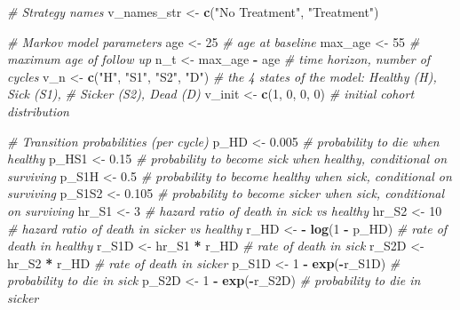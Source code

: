 \documentclass[
]{article}
\newenvironment{Shaded}{\begin{snugshade}}{\end{snugshade}}
\newcommand{\CommentTok}[1]{\textcolor[rgb]{0.56,0.35,0.01}{\textit{#1}}}
\newcommand{\DecValTok}[1]{\textcolor[rgb]{0.00,0.00,0.81}{#1}}
\newcommand{\FloatTok}[1]{\textcolor[rgb]{0.00,0.00,0.81}{#1}}
\newcommand{\KeywordTok}[1]{\textcolor[rgb]{0.13,0.29,0.53}{\textbf{#1}}}
\newcommand{\NormalTok}[1]{#1}
\newcommand{\OperatorTok}[1]{\textcolor[rgb]{0.81,0.36,0.00}{\textbf{#1}}}
\newcommand{\StringTok}[1]{\textcolor[rgb]{0.31,0.60,0.02}{#1}}
\begin{document}
\begin{Shaded}
\begin{Highlighting}[]
\CommentTok{# Strategy names}
\NormalTok{v_names_str <-}\StringTok{ }\KeywordTok{c}\NormalTok{(}\StringTok{"No Treatment"}\NormalTok{, }\StringTok{"Treatment"}\NormalTok{) }

\CommentTok{# Markov model parameters}
\NormalTok{age      <-}\StringTok{ }\DecValTok{25}                       \CommentTok{# age at baseline}
\NormalTok{max_age  <-}\StringTok{ }\DecValTok{55}                       \CommentTok{# maximum age of follow up}
\NormalTok{n_t      <-}\StringTok{ }\NormalTok{max_age }\OperatorTok{-}\StringTok{ }\NormalTok{age            }\CommentTok{# time horizon, number of cycles}
\NormalTok{v_n      <-}\StringTok{ }\KeywordTok{c}\NormalTok{(}\StringTok{"H"}\NormalTok{, }\StringTok{"S1"}\NormalTok{, }\StringTok{"S2"}\NormalTok{, }\StringTok{"D"}\NormalTok{)  }\CommentTok{# the 4 states of the model: Healthy (H), Sick (S1), }
                                     \CommentTok{# Sicker (S2), Dead (D)}
\NormalTok{v_init   <-}\StringTok{ }\KeywordTok{c}\NormalTok{(}\DecValTok{1}\NormalTok{, }\DecValTok{0}\NormalTok{, }\DecValTok{0}\NormalTok{, }\DecValTok{0}\NormalTok{)            }\CommentTok{# initial cohort distribution}

\CommentTok{# Transition probabilities (per cycle)}
\NormalTok{p_HD     <-}\StringTok{ }\FloatTok{0.005}                    \CommentTok{# probability to die when healthy}
\NormalTok{p_HS1    <-}\StringTok{ }\FloatTok{0.15}                     \CommentTok{# probability to become sick when healthy, conditional on surviving}
\NormalTok{p_S1H    <-}\StringTok{ }\FloatTok{0.5}                      \CommentTok{# probability to become healthy when sick, conditional on surviving}
\NormalTok{p_S1S2   <-}\StringTok{ }\FloatTok{0.105}                    \CommentTok{# probability to become sicker when sick, conditional on surviving}
\NormalTok{hr_S1    <-}\StringTok{ }\DecValTok{3}                        \CommentTok{# hazard ratio of death in sick vs healthy}
\NormalTok{hr_S2    <-}\StringTok{ }\DecValTok{10}                       \CommentTok{# hazard ratio of death in sicker vs healthy }
\NormalTok{r_HD     <-}\StringTok{ }\OperatorTok{-}\StringTok{ }\KeywordTok{log}\NormalTok{(}\DecValTok{1} \OperatorTok{-}\StringTok{ }\NormalTok{p_HD)          }\CommentTok{# rate of death in healthy}
\NormalTok{r_S1D    <-}\StringTok{ }\NormalTok{hr_S1 }\OperatorTok{*}\StringTok{ }\NormalTok{r_HD             }\CommentTok{# rate of death in sick}
\NormalTok{r_S2D    <-}\StringTok{ }\NormalTok{hr_S2 }\OperatorTok{*}\StringTok{ }\NormalTok{r_HD             }\CommentTok{# rate of death in sicker}
\NormalTok{p_S1D    <-}\StringTok{ }\DecValTok{1} \OperatorTok{-}\StringTok{ }\KeywordTok{exp}\NormalTok{(}\OperatorTok{-}\NormalTok{r_S1D)          }\CommentTok{# probability to die in sick}
\NormalTok{p_S2D    <-}\StringTok{ }\DecValTok{1} \OperatorTok{-}\StringTok{ }\KeywordTok{exp}\NormalTok{(}\OperatorTok{-}\NormalTok{r_S2D)          }\CommentTok{# probability to die in sicker}


\end{Highlighting}
\end{Shaded}
\end{document}
